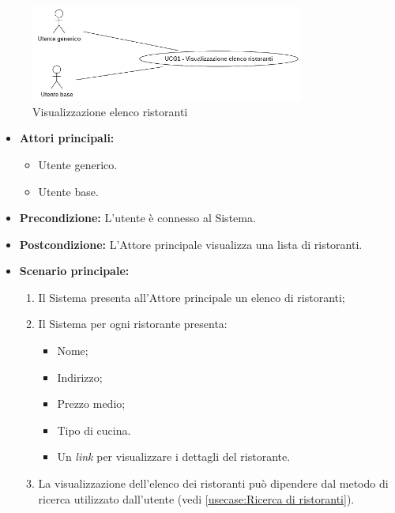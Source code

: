 
\label{usecase:Visualizzazione elenco ristoranti}

\begin{figure}[h]
	\centering
	\includegraphics[width=0.8\textwidth]{./uml/UCG1.png} 
	\caption{Visualizzazione elenco ristoranti}
	\label{fig:UCG1}
  \end{figure}

\begin{itemize}
	\item \textbf{Attori principali:} 
	\begin{itemize}
		\item Utente generico.
		\item Utente base.
	\end{itemize}

	\item \textbf{Precondizione:}
	      L'utente è connesso al Sistema.

	\item \textbf{Postcondizione:} L'Attore principale visualizza una lista di
	      ristoranti.

	\item \textbf{Scenario principale:}
	      \begin{enumerate}

		      \item Il Sistema presenta all'Attore principale un elenco di ristoranti;
		      \item Il Sistema per ogni ristorante presenta:
		            \begin{itemize}
			            \item Nome;
			            \item Indirizzo;
			            \item Prezzo medio;
			            \item Tipo di cucina.
			            \item Un \textit{link} per visualizzare i dettagli del ristorante.
		            \end{itemize}
				\item La visualizzazione dell'elenco dei ristoranti può dipendere dal metodo di ricerca utilizzato dall'utente (vedi \autoref{usecase:Ricerca di ristoranti}).

	      \end{enumerate}
\end{itemize}
